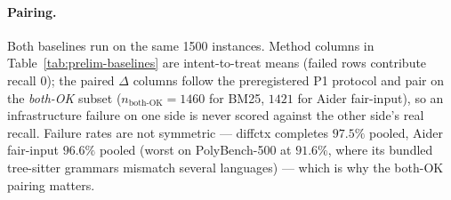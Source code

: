 \documentclass[11pt, a4paper]{article}
\begin{document}
\paragraph{Pairing.} Both baselines run on the same 1500 instances. Method columns in Table~\ref{tab:prelim-baselines} are intent-to-treat means (failed rows contribute recall $0$); the paired $\Delta$ columns follow the preregistered P1 protocol and pair on the \emph{both-OK} subset ($n_{\mathrm{both\text{-}OK}} = 1460$ for BM25, $1421$ for Aider fair-input), so an infrastructure failure on one side is never scored against the other side's real recall. Failure rates are not symmetric --- diffctx completes $97.5\%$ pooled, Aider fair-input $96.6\%$ pooled (worst on PolyBench-500 at $91.6\%$, where its bundled tree-sitter grammars mismatch several languages) --- which is why the both-OK pairing matters.
\end{document}
